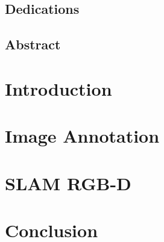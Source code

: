 \frontmatter

\makeflyleaf%

\chapter*{Dedications}%
\label{cha:dedications}


\chapter*{Abstract}%
\label{cha:abstract}


\tableofcontents

\mainmatter%

\part{Introduction}%
\label{prt:introduction}


\part{Image Annotation}%
\label{prt:image_annotation}


\part{SLAM RGB-D}%
\label{prt:slam_rgb_d}


\part{Conclusion}%
\label{prt:conclusion}


\backmatter%





